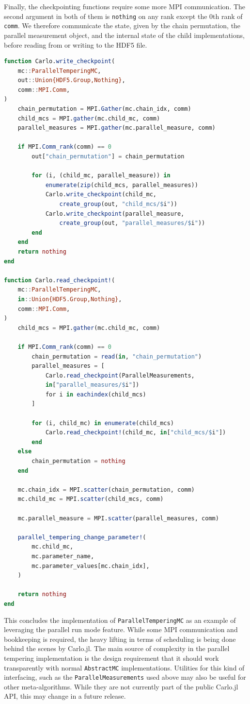 \documentclass{SciPost}
\begin{document}
Finally, the checkpointing functions require some more MPI communication. The second argument in both of them is \texttt{nothing} on any rank except the 0th rank of \texttt{comm}. We therefore communicate the state, given by the chain permutation, the parallel measurement object, and the internal state of the child implementations, before reading from or writing to the HDF5 file.
\begin{lstlisting}[language=julia]
function Carlo.write_checkpoint(
    mc::ParallelTemperingMC,
    out::Union{HDF5.Group,Nothing},
    comm::MPI.Comm,
)
    chain_permutation = MPI.Gather(mc.chain_idx, comm)
    child_mcs = MPI.gather(mc.child_mc, comm)
    parallel_measures = MPI.gather(mc.parallel_measure, comm)

    if MPI.Comm_rank(comm) == 0
        out["chain_permutation"] = chain_permutation

        for (i, (child_mc, parallel_measure)) in
            enumerate(zip(child_mcs, parallel_measures))
            Carlo.write_checkpoint(child_mc,
                create_group(out, "child_mcs/$i"))
            Carlo.write_checkpoint(parallel_measure,
                create_group(out, "parallel_measures/$i"))
        end
    end
    return nothing
end

function Carlo.read_checkpoint!(
    mc::ParallelTemperingMC,
    in::Union{HDF5.Group,Nothing},
    comm::MPI.Comm,
)
    child_mcs = MPI.gather(mc.child_mc, comm)

    if MPI.Comm_rank(comm) == 0
        chain_permutation = read(in, "chain_permutation")
        parallel_measures = [
            Carlo.read_checkpoint(ParallelMeasurements,
            in["parallel_measures/$i"])
            for i in eachindex(child_mcs)
        ]

        for (i, child_mc) in enumerate(child_mcs)
            Carlo.read_checkpoint!(child_mc, in["child_mcs/$i"])
        end
    else
        chain_permutation = nothing
    end

    mc.chain_idx = MPI.scatter(chain_permutation, comm)
    mc.child_mc = MPI.scatter(child_mcs, comm)

    mc.parallel_measure = MPI.scatter(parallel_measures, comm)

    parallel_tempering_change_parameter!(
        mc.child_mc,
        mc.parameter_name,
        mc.parameter_values[mc.chain_idx],
    )

    return nothing
end
\end{lstlisting}
This concludes the implementation of \texttt{ParallelTemperingMC} as an example of leveraging the parallel run mode feature. While some MPI communication and bookkeeping is required, the heavy lifting in terms of scheduling is being done behind the scenes by Carlo.jl. The main source of complexity in the parallel tempering implementation is the design requirement that it should work transparently with normal \texttt{AbstractMC} implementations. Utilities for this kind of interfacing, such as the \verb+ParallelMeasurements+ used above may also be useful for other meta-algorithms. While they are not currently part of the public Carlo.jl API, this may change in a future release.
\end{document}
